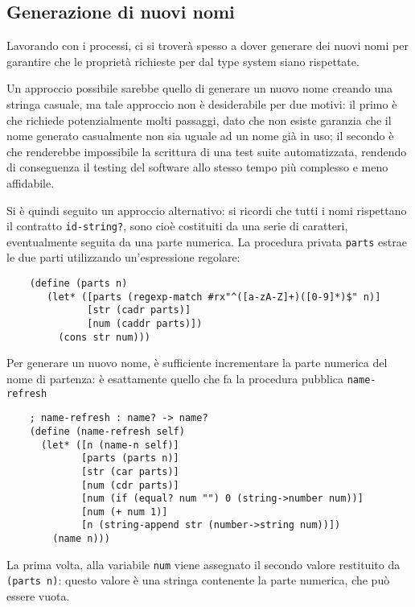 \subsection{Generazione di nuovi nomi}

Lavorando con i processi, ci si trover\`a spesso a dover generare dei
nuovi nomi per garantire che le propriet\`a richieste per dal type
system siano rispettate.

Un approccio possibile sarebbe quello di generare un nuovo nome creando
una stringa casuale, ma tale approccio non \`e desiderabile per due
motivi: il primo \`e che richiede potenzialmente molti passaggi, dato
che non esiste garanzia che il nome generato casualmente non sia uguale
ad un nome gi\`a in uso; il secondo \`e che renderebbe impossibile la
scrittura di una test suite automatizzata, rendendo di conseguenza il
testing del software allo stesso tempo pi\`u complesso e meno affidabile.

Si \`e quindi seguito un approccio alternativo: si ricordi che tutti i
nomi rispettano il contratto \lstinline{id-string?}, sono cio\`e
costituiti da una serie di caratteri, eventualmente seguita da una parte
numerica. La procedura privata \lstinline{parts} estrae le due parti
utilizzando un'espressione regolare:

\begin{lstlisting}
    (define (parts n)
       (let* ([parts (regexp-match #rx"^([a-zA-Z]+)([0-9]*)$" n)]
              [str (cadr parts)]
              [num (caddr parts)])
         (cons str num)))
\end{lstlisting}

Per generare un nuovo nome, \`e sufficiente incrementare la parte numerica
del nome di partenza: \`e esattamente quello che fa la procedura pubblica
\lstinline{name-refresh}

\begin{lstlisting}
    ; name-refresh : name? -> name?
    (define (name-refresh self)
      (let* ([n (name-n self)]
             [parts (parts n)]
             [str (car parts)]
             [num (cdr parts)]
             [num (if (equal? num "") 0 (string->number num))]
             [num (+ num 1)]
             [n (string-append str (number->string num))])
        (name n)))
\end{lstlisting}

La prima volta, alla variabile \lstinline{num} viene assegnato il secondo
valore restituito da \lstinline{(parts n)}: questo valore \`e una stringa
contenente la parte numerica, che pu\`o essere vuota.

